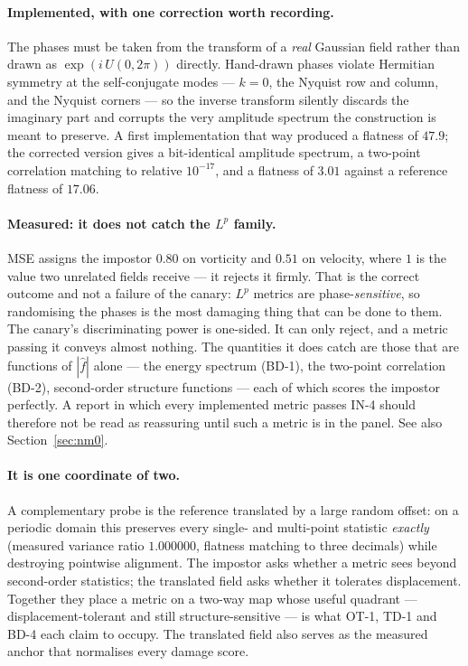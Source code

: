 \documentclass[11pt]{article}
\begin{document}
\paragraph{Implemented, with one correction worth recording.} The phases must be taken from
the transform of a \emph{real} Gaussian field rather than drawn as $\exp(i\,U(0,2\pi))$
directly. Hand-drawn phases violate Hermitian symmetry at the self-conjugate modes --- $k=0$,
the Nyquist row and column, and the Nyquist corners --- so the inverse transform silently
discards the imaginary part and corrupts the very amplitude spectrum the construction is
meant to preserve. A first implementation that way produced a flatness of $47.9$; the
corrected version gives a bit-identical amplitude spectrum, a two-point correlation matching
to relative $10^{-17}$, and a flatness of $3.01$ against a reference flatness of $17.06$.

\paragraph{Measured: it does not catch the $L^p$ family.} MSE assigns the impostor $0.80$ on
vorticity and $0.51$ on velocity, where $1$ is the value two unrelated fields receive --- it
rejects it firmly. That is the correct outcome and not a failure of the canary: $L^p$ metrics
are phase-\emph{sensitive}, so randomising the phases is the most damaging thing that can be
done to them. The canary's discriminating power is one-sided. It can only reject, and a
metric passing it conveys almost nothing. The quantities it does catch are those that are
functions of $|\hat f|$ alone --- the energy spectrum (BD-1), the two-point correlation
(BD-2), second-order structure functions --- each of which scores the impostor perfectly. A
report in which every implemented metric passes IN-4 should therefore not be read as
reassuring until such a metric is in the panel. See also Section~\ref{sec:nm0}.

\paragraph{It is one coordinate of two.} A complementary probe is the reference translated by
a large random offset: on a periodic domain this preserves every single- and multi-point
statistic \emph{exactly} (measured variance ratio $1.000000$, flatness matching to three
decimals) while destroying pointwise alignment. The impostor asks whether a metric sees
beyond second-order statistics; the translated field asks whether it tolerates displacement.
Together they place a metric on a two-way map whose useful quadrant --- displacement-tolerant
and still structure-sensitive --- is what OT-1, TD-1 and BD-4 each claim to occupy. The
translated field also serves as the measured anchor that normalises every damage score.
\end{document}
